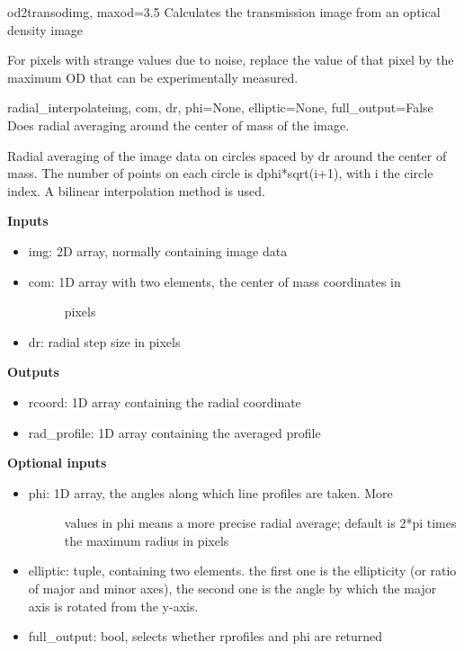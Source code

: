 \documentclass[letterpaper,10pt,english]{manual}
\begin{document}
\hypertarget{imageprocess.od2trans}{}\begin{funcdesc}{od2trans}{odimg, maxod=3.5}
Calculates the transmission image from an optical density image

For pixels with strange values due to noise, replace the value of that pixel
by the maximum OD that can be experimentally measured.
\end{funcdesc}

\hypertarget{imageprocess.radial_interpolate}{}\begin{funcdesc}{radial\_interpolate}{img, com, dr, phi=None, elliptic=None, full\_output=False}
Does radial averaging around the center of mass of the image.

Radial averaging of the image data on circles spaced by dr around the
center of mass. The number of points on each circle is dphi*sqrt(i+1),
with i the circle index. A bilinear interpolation method is used.

\textbf{Inputs}
\begin{itemize}
\item {} 
img: 2D array, normally containing image data

\item {} \begin{description}
\item[com: 1D array with two elements, the center of mass coordinates in]
pixels

\end{description}

\item {} 
dr: radial step size in pixels

\end{itemize}

\textbf{Outputs}
\begin{itemize}
\item {} 
rcoord: 1D array containing the radial coordinate

\item {} 
rad\_profile: 1D array containing the averaged profile

\end{itemize}

\textbf{Optional inputs}
\begin{itemize}
\item {} \begin{description}
\item[phi: 1D array, the angles along which line profiles are taken. More]
values in phi means a more precise radial average; default is
2*pi times the maximum radius in pixels

\end{description}

\item {} 
elliptic: tuple, containing two elements. the first one is the
ellipticity (or ratio of major and minor axes), the second one is the
angle by which the major axis is rotated from the y-axis.

\item {} 
full\_output: bool, selects whether rprofiles and phi are returned

\end{itemize}
\end{funcdesc}
\end{document}
